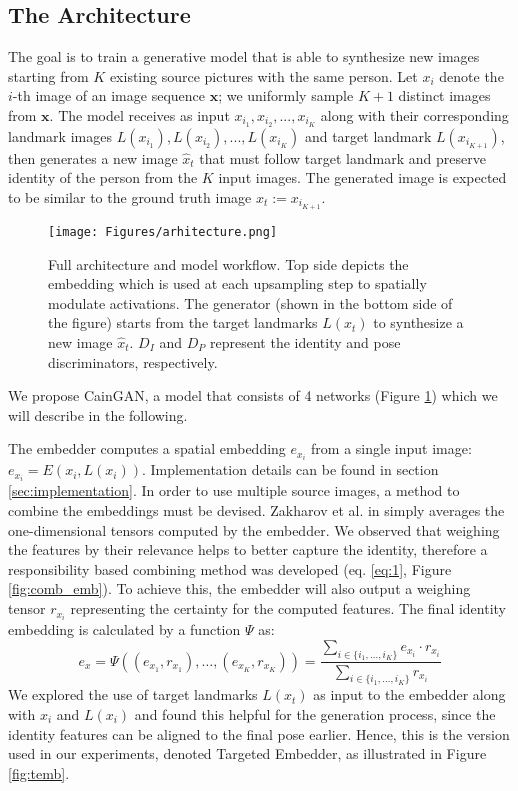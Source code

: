 \documentclass[11pt,a4paper]{article}
\begin{document}
\subsection{The Architecture}
The goal is to train a generative model that is able to synthesize new images starting from $K$ existing source pictures with the same person. Let $x_i$ denote the $i$-th image of an image sequence $\mathbf{x}$; we uniformly sample $K+1$ distinct images from $\mathbf{x}$. The model receives as input $x_{i_1}, x_{i_2}, ..., x_{i_K}$ along with their corresponding landmark images \cite{bulat2017far} $L(x_{i_1}), L(x_{i_2}), ..., L(x_{i_K})$ and target landmark $L(x_{i_{K+1}})$, then generates a new image $\hat{x}_t$ that must follow target landmark and preserve identity of the person from the $K$ input images. The generated image is expected to be similar to the ground truth image $x_t := x_{i_{K+1}}$.

\begin{figure}[!t]
    \centering
    \texttt{[image: Figures/arhitecture.png]}
    \caption{Full architecture and model workflow. Top side depicts the embedding which is used at each upsampling step to spatially modulate activations. The generator (shown in the bottom side of the figure) starts from the target landmarks $L(x_t)$ to synthesize a new image $\hat{x}_t$. $D_I$ and $D_P$ represent the identity and pose discriminators, respectively.}
    \label{fig:full_arhi}
\end{figure}

We propose CainGAN, a model that consists of 4 networks (Figure \ref{fig:full_arhi}) which we will describe in the following.  

The embedder computes a spatial embedding $e_{x_i}$ from a single input image: $e_{x_i} = E(x_i, L(x_i))$. Implementation details can be found in section \ref{sec:implementation}. In order to use multiple source images, a method to combine the embeddings must be devised. Zakharov et al. in \cite{zakharov2019fewshot} simply averages the one-dimensional tensors computed by the embedder. We observed that weighing the features by their relevance helps to better capture the identity, therefore a responsibility based combining method was developed (eq. \eqref{eq:1}, Figure \ref{fig:comb_emb}). To achieve this, the embedder will also output a weighing tensor $r_{x_i}$ representing the certainty for the computed features. The final identity embedding is calculated by a function $\Psi$ as:
\begin{equation}
    e_x = \Psi\left((e_{x_1}, r_{x_1}), \dots, (e_{x_K}, r_{x_K})\right) = \frac{\sum_{i \in \{i_1, \ldots, i_K\}}e_{x_i} \cdot r_{x_i}}{\sum_{i \in \{i_1, \ldots, i_K\}}r_{x_i}}
    \label{eq:1}
\end{equation}  
We explored the use of target landmarks $L(x_t)$ as input to the embedder along with $x_i$ and $L(x_i)$ and found this helpful for the generation process, since the identity features can be aligned to the final pose earlier. Hence, this is the version used in our experiments, denoted Targeted Embedder, as illustrated in Figure \ref{fig:temb}.
\end{document}
